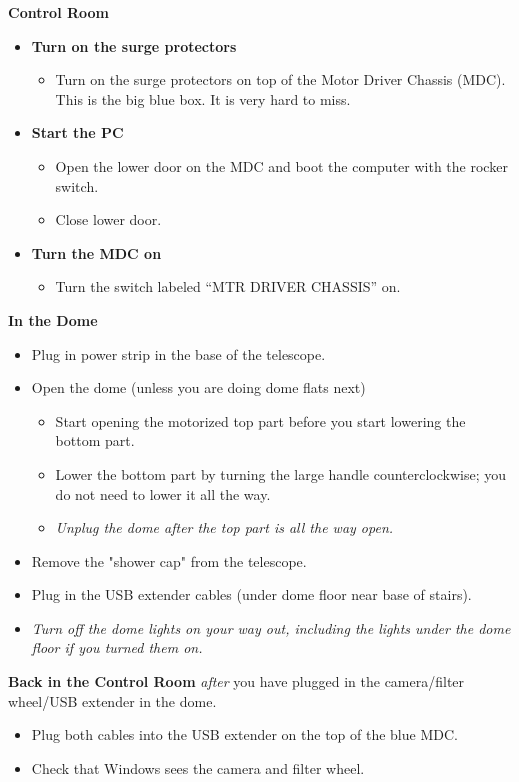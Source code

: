 \documentclass[letterpaper, 12pt]{report}
\begin{document}
{\large\textbf{Control Room}}
\begin{itemize}
	\item \textbf{Turn on the surge protectors}
	\begin{itemize}
		\item Turn on the surge protectors on top of the Motor Driver Chassis (MDC). This is the big blue box. It is very hard to miss.
	\end{itemize}
	\item \textbf{Start the PC}
	\begin{itemize}
		\item Open the lower door on the MDC and boot the computer with the rocker switch.
		\item Close lower door.
	\end{itemize}
	\item \textbf{Turn the MDC on}
	\begin{itemize}
		\item Turn the switch labeled ``MTR DRIVER CHASSIS'' on.
	\end{itemize}
\end{itemize}

\large{\textbf{In the Dome}}
\begin{itemize}
	\item Plug in power strip in the base of the telescope.
	\item Open the dome (unless you are doing dome flats next)
	\begin{itemize}
		\item Start opening the motorized top part before you start lowering the bottom part.
		\item Lower the bottom part by turning the large handle counterclockwise; you do not need to lower it all the way.
		\item \emph{Unplug the dome after the top part is all the way open.}
	\end{itemize}
	\item Remove the "shower cap" from the telescope.
	\item Plug in the USB extender cables (under dome floor near base of stairs).
	\item \emph{Turn off the dome lights on your way out, including the lights under the dome floor if you turned them on.}
\end{itemize}

\large{\textbf{Back in the Control Room}} \emph{after} you have plugged in the camera/filter wheel/USB extender in the dome.
\begin{itemize}
	\item Plug both cables into the USB extender on the top of the blue MDC.
	\item Check that Windows sees the camera and filter wheel.
\end{itemize}
\newpage
\end{document}
